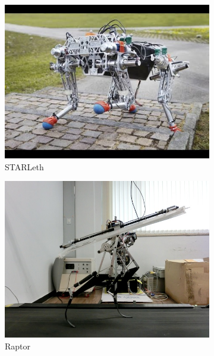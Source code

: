 \begin{figure}[h]
\label{fig:biped_robots}
	\centering
    \begin{subfigure}[b]{0.32\textwidth}
        \includegraphics[width=\textwidth]{figures/starleth.jpg}
        \caption{STARLeth}
        \label{fig:starleth}
    \end{subfigure}
    \centering
    \begin{subfigure}[b]{0.32\textwidth}
        \includegraphics[width=\textwidth]{figures/biped_kaist.jpg}
        \caption{Raptor}
        \label{fig:kaist}
    \end{subfigure}
    \centering
    \begin{subfigure}[b]{0.32\textwidth}

\end{subfigure}
\end{figure}

